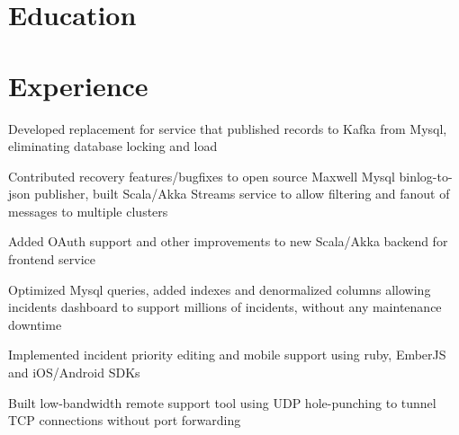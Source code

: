 \documentclass[12pt]{jmichaud-resume}
\begin{document}
\begin{minipage}[t]{0.3\textwidth}
\vspace{20pt}

\section{Education} 



\end{minipage}
\hfill
\begin{minipage}[t]{0.65\textwidth}
\section{Experience}
 \hfill {}

\vspace{7pt}
\begin{tightemize}
	\item Developed replacement for service that published records to Kafka from Mysql, eliminating database locking and load
	\item Contributed recovery features/bugfixes to open source Maxwell Mysql binlog-to-json publisher, built Scala/Akka Streams service to allow filtering and fanout of messages to multiple clusters
	\item Added OAuth support and other improvements to new Scala/Akka backend for frontend service
	
\end{tightemize}
\sectionsep
{}\hfill {}

\begin{tightemize}
	\item Optimized Mysql queries, added indexes and denormalized columns allowing incidents dashboard to support millions of incidents, without any maintenance downtime
	\item Implemented incident priority editing and mobile support using ruby, EmberJS and iOS/Android SDKs
\end{tightemize}
\sectionsep

 \hfill {}
\begin{tightemize}
	\item Built low-bandwidth remote support tool using UDP hole-punching to tunnel TCP connections without port forwarding
\end{tightemize}
\sectionsep


\end{minipage}
\end{document}
